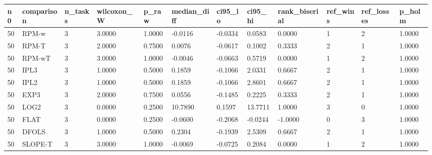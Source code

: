 \begin{tabular}{llllllllllll}
\hline
n0 & comparison & n\_tasks & wilcoxon\_W & p\_raw & median\_diff & ci95\_lo & ci95\_hi & rank\_biserial & ref\_wins & ref\_losses & p\_holm \\
\hline
50 & RPM-w & 3 & 3.0000 & 1.0000 & -0.0116 & -0.0334 & 0.0583 & 0.0000 & 1 & 2 & 1.0000 \\
50 & RPM-T & 3 & 2.0000 & 0.7500 & 0.0076 & -0.0617 & 0.1002 & 0.3333 & 2 & 1 & 1.0000 \\
50 & RPM-wT & 3 & 3.0000 & 1.0000 & -0.0046 & -0.0663 & 0.5719 & 0.0000 & 1 & 2 & 1.0000 \\
50 & IPL3 & 3 & 1.0000 & 0.5000 & 0.1859 & -0.1066 & 2.0331 & 0.6667 & 2 & 1 & 1.0000 \\
50 & IPL2 & 3 & 1.0000 & 0.5000 & 0.1859 & -0.1066 & 2.8601 & 0.6667 & 2 & 1 & 1.0000 \\
50 & EXP3 & 3 & 2.0000 & 0.7500 & 0.0556 & -0.1485 & 0.2225 & 0.3333 & 2 & 1 & 1.0000 \\
50 & LOG2 & 3 & 0.0000 & 0.2500 & 10.7890 & 0.1597 & 13.7711 & 1.0000 & 3 & 0 & 1.0000 \\
50 & FLAT & 3 & 0.0000 & 0.2500 & -0.0600 & -0.2068 & -0.0244 & -1.0000 & 0 & 3 & 1.0000 \\
50 & DFOLS & 3 & 1.0000 & 0.5000 & 0.2304 & -0.1939 & 2.5309 & 0.6667 & 2 & 1 & 1.0000 \\
50 & SLOPE-T & 3 & 3.0000 & 1.0000 & -0.0069 & -0.0725 & 0.2084 & 0.0000 & 1 & 2 & 1.0000 \\
\hline
\end{tabular}
